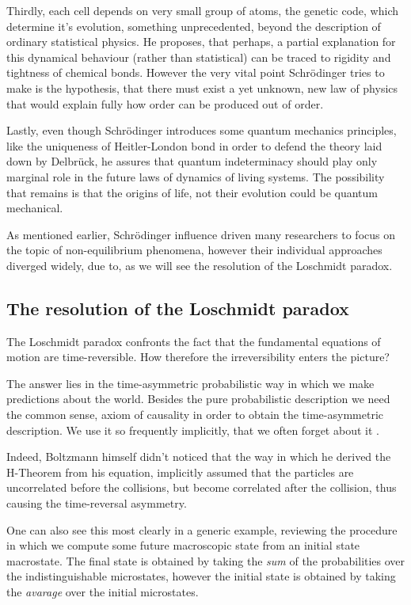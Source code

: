 \documentclass[a4paper,12pt]{article}
\begin{document}
Thirdly, each cell depends on very small group of atoms, the genetic code, which determine it's evolution, something unprecedented, beyond the description of ordinary statistical physics. He proposes, that perhaps, a partial explanation for this dynamical behaviour (rather than statistical) can be traced to rigidity and tightness of chemical bonds. However the very vital point Schrödinger tries to make is the hypothesis, that there must exist a yet unknown, new law of physics that would explain fully how order can be produced out of order. 

Lastly, even though Schrödinger introduces some quantum mechanics principles, like the uniqueness of Heitler-London bond in order to defend the theory laid down by Delbrück, he assures that quantum indeterminacy should play only marginal role in the future laws of dynamics of living systems. The possibility that remains is that the origins of life, not their evolution could be quantum mechanical.

As mentioned earlier, Schrödinger influence driven many researchers to focus on the topic of non-equilibrium phenomena, however their individual approaches diverged widely, due to, as we will see the resolution of the Loschmidt paradox.

\subsection{The resolution of the Loschmidt paradox }

The Loschmidt paradox confronts the fact that the fundamental equations of motion are time-reversible. How therefore the irreversibility enters the picture?

The answer lies in the time-asymmetric probabilistic way in which we make predictions about the world. 
Besides the pure probabilistic description we need the common sense, axiom of causality in order to obtain the time-asymmetric description.
We use it so frequently implicitly, that we often forget about it \cite{Evans:2016tq}. 

Indeed, Boltzmann himself didn't noticed that the way in which he derived the H-Theorem from his equation, implicitly assumed that the particles are uncorrelated before the collisions, but become correlated after the collision\cite{Dorfman:ozm67-zD}\cite{Wolfram:552851}, thus causing the time-reversal asymmetry.

One can also see this most clearly in a generic example, reviewing the procedure in which we compute some future macroscopic state from an initial state macrostate. The final state is obtained by taking the \textit{sum} of the probabilities over the indistinguishable microstates, however the initial state is obtained by taking the \textit{avarage} over the initial microstates.
\end{document}
